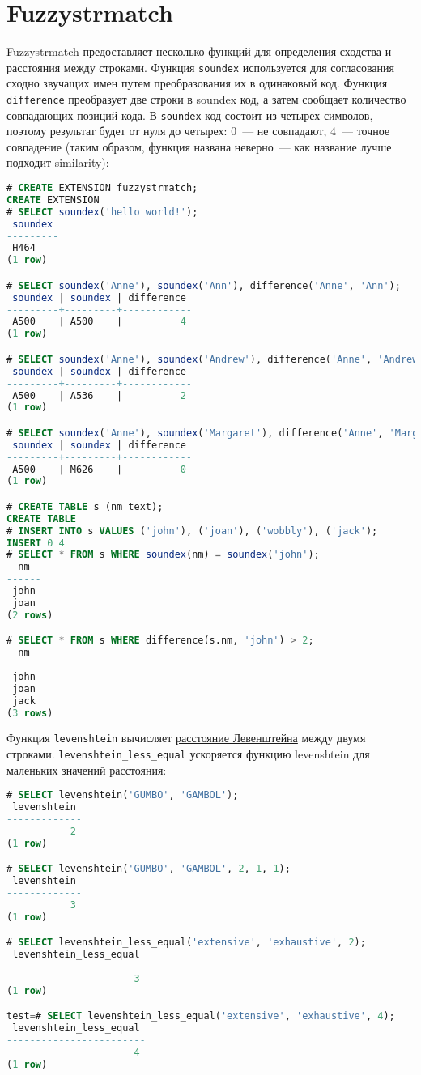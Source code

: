 \section{Fuzzystrmatch}

\href{https://www.postgresql.org/docs/current/static/fuzzystrmatch.html}{Fuzzystrmatch} предоставляет несколько функций для определения сходства и расстояния между строками. Функция \lstinline!soundex! используется для согласования сходно звучащих имен путем преобразования их в одинаковый код. Функция \lstinline!difference! преобразует две строки в soundex код, а затем сообщает количество совпадающих позиций кода. В \lstinline!soundex! код состоит из четырех символов, поэтому результат будет от нуля до четырех: 0~--- не совпадают, 4~--- точное совпадение (таким образом, функция названа неверно~--- как название лучше подходит similarity):

\begin{lstlisting}[language=SQL,label=lst:ext_fuzzystrmatch1,caption=soundex]
# CREATE EXTENSION fuzzystrmatch;
CREATE EXTENSION
# SELECT soundex('hello world!');
 soundex
---------
 H464
(1 row)

# SELECT soundex('Anne'), soundex('Ann'), difference('Anne', 'Ann');
 soundex | soundex | difference
---------+---------+------------
 A500    | A500    |          4
(1 row)

# SELECT soundex('Anne'), soundex('Andrew'), difference('Anne', 'Andrew');
 soundex | soundex | difference
---------+---------+------------
 A500    | A536    |          2
(1 row)

# SELECT soundex('Anne'), soundex('Margaret'), difference('Anne', 'Margaret');
 soundex | soundex | difference
---------+---------+------------
 A500    | M626    |          0
(1 row)

# CREATE TABLE s (nm text);
CREATE TABLE
# INSERT INTO s VALUES ('john'), ('joan'), ('wobbly'), ('jack');
INSERT 0 4
# SELECT * FROM s WHERE soundex(nm) = soundex('john');
  nm
------
 john
 joan
(2 rows)

# SELECT * FROM s WHERE difference(s.nm, 'john') > 2;
  nm
------
 john
 joan
 jack
(3 rows)
\end{lstlisting}

Функция \lstinline!levenshtein! вычисляет \href{http://en.wikipedia.org/wiki/Levenshtein\_distance}{расстояние Левенштейна} между двумя строками. \lstinline!levenshtein_less_equal! ускоряется функцию levenshtein для маленьких значений расстояния:

\begin{lstlisting}[language=SQL,label=lst:ext_fuzzystrmatch2,caption=levenshtein]
# SELECT levenshtein('GUMBO', 'GAMBOL');
 levenshtein
-------------
           2
(1 row)

# SELECT levenshtein('GUMBO', 'GAMBOL', 2, 1, 1);
 levenshtein
-------------
           3
(1 row)

# SELECT levenshtein_less_equal('extensive', 'exhaustive', 2);
 levenshtein_less_equal
------------------------
                      3
(1 row)

test=# SELECT levenshtein_less_equal('extensive', 'exhaustive', 4);
 levenshtein_less_equal
------------------------
                      4
(1 row)
\end{lstlisting}

